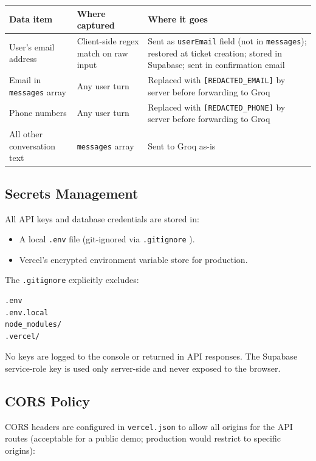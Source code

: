 \documentclass[12pt, a4paper]{article}
\newcommand{\inlinecode}[1]{%
  \colorbox{inlinecode!20}{\texttt{\small #1}}%
}
\begin{document}
\begin{center}
\begin{tabular}{p{4.5cm}p{4cm}p{5cm}}
\toprule
\textbf{Data item} & \textbf{Where captured} & \textbf{Where it goes} \\
\midrule
User's email address & Client-side regex match on raw input & Sent as \texttt{userEmail} field (not in \texttt{messages}); restored at ticket creation; stored in Supabase; sent in confirmation email \\
Email in \texttt{messages} array & Any user turn & Replaced with \texttt{[REDACTED\_EMAIL]} by server before forwarding to Groq \\
Phone numbers & Any user turn & Replaced with \texttt{[REDACTED\_PHONE]} by server before forwarding to Groq \\
All other conversation text & \texttt{messages} array & Sent to Groq as-is \\
\bottomrule
\end{tabular}
\end{center}

\subsection{Secrets Management}

All API keys and database credentials are stored in:

\begin{itemize}[leftmargin=*]
  \item A local \inlinecode{.env} file (git-ignored via \inlinecode{.gitignore}).
  \item Vercel's encrypted environment variable store for production.
\end{itemize}

The \inlinecode{.gitignore} explicitly excludes:

\begin{lstlisting}[language=bash, caption={.gitignore entries}]
.env
.env.local
node_modules/
.vercel/
\end{lstlisting}

No keys are logged to the console or returned in API responses. The Supabase service-role
key is used only server-side and never exposed to the browser.

\subsection{CORS Policy}

CORS headers are configured in \inlinecode{vercel.json} to allow all origins for the
API routes (acceptable for a public demo; production would restrict to specific origins):
\end{document}
